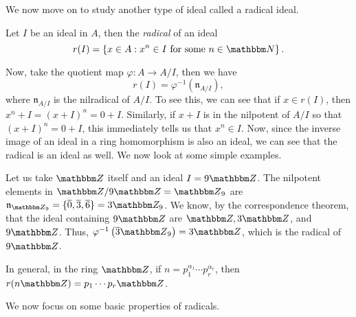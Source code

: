 We now move on to study another type of ideal called a radical ideal. 
\begin{definition}[Radical]\label{def: radical}
    Let $I$ be an ideal in $A$, then the {\it radical} of an ideal 
    \[
    r(I)=\left\{x \in A: x^{n} \in I\text{ for some }n \in {\N}\right\}.
    \]
\end{definition}
Now, take the quotient map $\varphi: A \rightarrow A / I$, then we have
\begin{equation}\label{eq: radical-nilradical}
    r(I)=\varphi^{-1}\left(\mathfrak{n}_{A / I}\right),
\end{equation}
where $\mathfrak{n}_{A / I}$ is the nilradical of $A/I$. To see this, we can see that if $x \in r(I)$, then $x^n+I = (x+I)^n = 0 +I$. Similarly, if $x+I$ is in the nilpotent of $A / I$ so that $(x+I)^n = 0+I$, this immediately tells us that $x^n \in I$. Now, since the inverse image of an ideal in a ring homomorphism is also an ideal, we can see that the radical is an ideal as well. We now look at some simple examples.
\begin{example}
    Let us take ${\Z}$ itself and an ideal $I=9 {\Z}$. The nilpotent elements in ${\Z} / 9 {\Z} = {\Z}_9$ are $\mathfrak{n}_{{\Z}_{9}}=\{\ol{0}, \ol{3}, \ol{6}\} = 3\Z_9$. We know, by the correspondence theorem, that the ideal containing $9\Z$ are $\Z, 3\Z$, and $9\Z$. Thus, $\varphi^{-1}\left(\ol{3} {\Z}_{9}\right)=3 {\Z}$, which is the radical of $9\Z$.

    In general, in the ring ${\Z}$, if $n=p_{1}^{\alpha_{1}} \cdots p_{r}^{\alpha_{r}}$, then $r(n {\Z}) = p_{1} \cdots p_{r} {\Z}$.
\end{example}

 We now focus on some basic properties of radicals.

